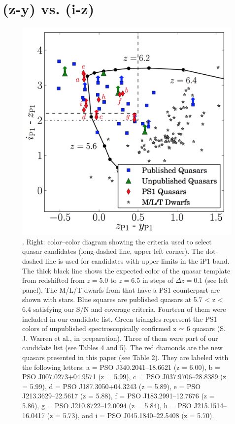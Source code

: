 \documentclass[11pt,a4paper]{article}
\begin{document}
\section{(z-y) vs. (i-z)}

    \begin{figure}
      \centering
      \includegraphics[width=16.0cm,  trim={0.0cm 0 0 0},clip, angle=0]
      {Banados_2014_Fig1.jpeg}
      \caption[]{\citet{Banados2014}. 
        Right: color–color diagram showing the criteria used to select quasar
        candidates (long-dashed line, upper left corner). The dot-dashed line
        is used for candidates with upper limits in the iP1 band. The thick
        black line shows the expected color of the quasar template from
        \citet{Decarli2010} redshifted from $z=5.0$ to $z=6.5$ in steps of
        $\Delta z = 0.1$ (see left panel). The M/L/T dwarfs from \citet{Dupuy_Liu2012}  that have a PS1 counterpart are shown with stars. Blue squares are
        published quasars at 5.7 < z < 6.4 satisfying our S/N and coverage
        criteria. Fourteen of them were included in our candidate list. Green
        triangles represent the PS1 colors of unpublished spectroscopically
        confirmed z ∼ 6 quasars (S. J. Warren et al., in preparation). Three
        of them were part of our candidate list (see Tables 4 and 5). The red
        diamonds are the new quasars presented in this paper (see Table
        2). They are labeled with the following letters: a = PSO
        J340.2041–18.6621 (z = 6.00), b = PSO J007.0273+04.9571 (z = 5.99), c
        = PSO J037.9706–28.8389 (z = 5.99), d = PSO J187.3050+04.3243 (z =
        5.89), e = PSO J213.3629–22.5617 (z = 5.88), f = PSO J183.2991–12.7676
        (z = 5.86), g = PSO J210.8722–12.0094 (z = 5.84), h = PSO
        J215.1514–16.0417 (z = 5.73), and i = PSO J045.1840–22.5408 (z =
        5.70).
}
      \label{fig:Banados2014}
    \end{figure}
\end{document}
